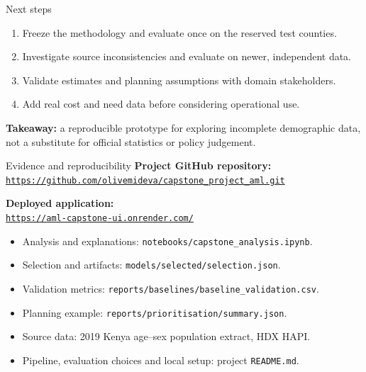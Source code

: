 \documentclass[aspectratio=169,11pt]{beamer}
\newcommand{\deploymentlink}{%
  \href{https://aml-capstone-ui.onrender.com/}{%
    \textcolor{RoyalPurple}{\nolinkurl{https://aml-capstone-ui.onrender.com/}}}}
\begin{document}
\begin{frame}{Next steps}
  \begin{enumerate}
    \item Freeze the methodology and evaluate once on the reserved test counties.
    \item Investigate source inconsistencies and evaluate on newer, independent data.
    \item Validate estimates and planning assumptions with domain stakeholders.
    \item Add real cost and need data before considering operational use.
  \end{enumerate}
  \vspace{1em}
  \textcolor{RoyalPurple}{\textbf{Takeaway:}} a reproducible prototype for exploring
  incomplete demographic data, not a substitute for official statistics or policy judgement.
\end{frame}

\begin{frame}{Evidence and reproducibility}
  \small
  \textbf{Project GitHub repository:}\\
  \href{https://github.com/olivemideva/capstone_project_aml.git}{%
    \textcolor{RoyalPurple}{\nolinkurl{https://github.com/olivemideva/capstone_project_aml.git}}}
  \par\vspace{0.3em}
  \textbf{Deployed application:}\\
  \deploymentlink
  \vspace{0.4em}
  \begin{itemize}
    \item Analysis and explanations: \texttt{notebooks/capstone\_analysis.ipynb}.
    \item Selection and artifacts: \texttt{models/selected/selection.json}.
    \item Validation metrics: \texttt{reports/baselines/baseline\_validation.csv}.
    \item Planning example: \texttt{reports/prioritisation/summary.json}.
    \item Source data: 2019 Kenya age--sex population extract, HDX HAPI.
    \item Pipeline, evaluation choices and local setup: project \texttt{README.md}.
  \end{itemize}
\end{frame}
\end{document}
